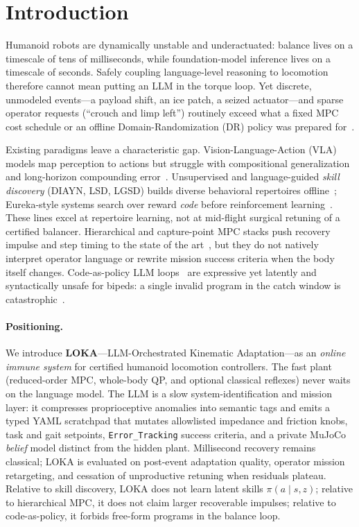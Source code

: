 \section{Introduction}
\label{sec:introduction}

Humanoid robots are dynamically unstable and underactuated: balance lives on a timescale of tens of milliseconds, while foundation-model inference lives on a timescale of seconds.
Safely coupling language-level reasoning to locomotion therefore cannot mean putting an LLM in the torque loop.
Yet discrete, unmodeled events---a payload shift, an ice patch, a seized actuator---and sparse operator requests (``crouch and limp left'') routinely exceed what a fixed MPC cost schedule or an offline Domain-Randomization (DR) policy was prepared for~\cite{TobinDR}.

Existing paradigms leave a characteristic gap.
Vision-Language-Action (VLA) models map perception to actions but struggle with compositional generalization and long-horizon compounding error~\cite{OpenVLA, ACT_VLA}.
Unsupervised and language-guided \emph{skill discovery} (DIAYN, LSD, LGSD) builds diverse behavioral repertoires offline~\cite{DIAYN, LSD, LGSD}; Eureka-style systems search over reward \emph{code} before reinforcement learning~\cite{Eureka, Lang2Reward}.
These lines excel at repertoire learning, not at mid-flight surgical retuning of a certified balancer.
Hierarchical and capture-point MPC stacks push recovery impulse and step timing to the state of the art~\cite{HierarchicalPushMPC, ALIPWalkMPC}, but they do not natively interpret operator language or rewrite mission success criteria when the body itself changes.
Code-as-policy LLM loops~\cite{Lang2Reward, Eureka} are expressive yet latently and syntactically unsafe for bipeds: a single invalid program in the catch window is catastrophic~\cite{CodeAsPolicyBrittleness}.

\paragraph{Positioning.}
We introduce \textbf{LOKA}---LLM-Orchestrated Kinematic Adaptation---as an \emph{online immune system} for certified humanoid locomotion controllers.
The fast plant (reduced-order MPC, whole-body QP, and optional classical reflexes) never waits on the language model.
The LLM is a slow system-identification and mission layer: it compresses proprioceptive anomalies into semantic tags and emits a typed YAML scratchpad that mutates allowlisted impedance and friction knobs, task and gait setpoints, \texttt{Error\_Tracking} success criteria, and a private MuJoCo \emph{belief} model distinct from the hidden plant.
Millisecond recovery remains classical; LOKA is evaluated on post-event adaptation quality, operator mission retargeting, and cessation of unproductive retuning when residuals plateau.
Relative to skill discovery, LOKA does not learn latent skills \(\pi(a{\mid}s,z)\); relative to hierarchical MPC, it does not claim larger recoverable impulses; relative to code-as-policy, it forbids free-form programs in the balance loop.

